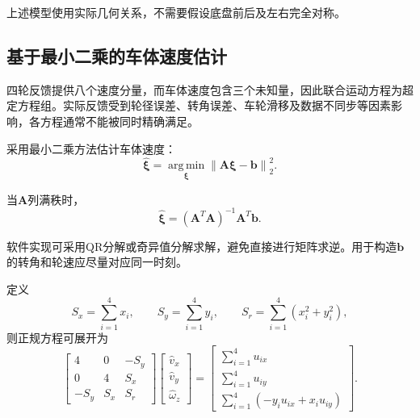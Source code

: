 \documentclass[UTF8,12pt,a4paper,openany]{ctexbook}
\begin{document}
上述模型使用实际几何关系，不需要假设底盘前后及左右完全对称。

\subsection{基于最小二乘的车体速度估计}

四轮反馈提供八个速度分量，而车体速度包含三个未知量，因此联合运动方程为超定方程组。实际反馈受到轮径误差、转角误差、车轮滑移及数据不同步等因素影响，各方程通常不能被同时精确满足。

采用最小二乘方法估计车体速度：
\begin{equation}
    \hat{\boldsymbol{\xi}}
    =
    \underset{\boldsymbol{\xi}}
    {\operatorname{arg\,min}}
    \left\|
        \boldsymbol{A}\boldsymbol{\xi}
        -
        \boldsymbol{b}
    \right\|_2^2.
    \label{eq:kc-ls-objective}
\end{equation}

当$\boldsymbol{A}$列满秩时，
\begin{equation}
    \hat{\boldsymbol{\xi}}
    =
    \left(
        \boldsymbol{A}^{T}\boldsymbol{A}
    \right)^{-1}
    \boldsymbol{A}^{T}\boldsymbol{b}.
    \label{eq:kc-ls-solution}
\end{equation}

软件实现可采用QR分解或奇异值分解求解，避免直接进行矩阵求逆。用于构造$\boldsymbol{b}$的转角和轮速应尽量对应同一时刻。

定义
\begin{equation}
    S_x=\sum_{i=1}^{4}x_i,
    \qquad
    S_y=\sum_{i=1}^{4}y_i,
    \qquad
    S_r=\sum_{i=1}^{4}(x_i^2+y_i^2),
\end{equation}
则正规方程可展开为
\begin{equation}
    \begin{bmatrix}
        4&0&-S_y\\
        0&4&S_x\\
        -S_y&S_x&S_r
    \end{bmatrix}
    \begin{bmatrix}
        \hat v_x\\
        \hat v_y\\
        \hat\omega_z
    \end{bmatrix}
    =
    \begin{bmatrix}
        \displaystyle\sum_{i=1}^{4}u_{ix}\\[2mm]
        \displaystyle\sum_{i=1}^{4}u_{iy}\\[2mm]
        \displaystyle\sum_{i=1}^{4}
        (-y_i u_{ix}+x_i u_{iy})
    \end{bmatrix}.
    \label{eq:kc-normal-equation}
\end{equation}
\end{document}
